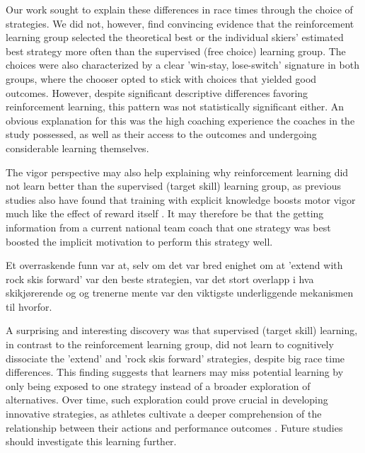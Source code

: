 Our work sought to explain these differences in race times through the choice of strategies. We did not, however,  find convincing evidence that the reinforcement learning group selected the theoretical best or the individual skiers' estimated best strategy more often than the supervised (free choice) learning group. The choices were also characterized by a clear 'win-stay, lose-switch' signature in both groups, where the chooser opted to stick with choices that yielded good outcomes. However, despite significant descriptive differences favoring reinforcement learning, this pattern was not statistically significant either. An obvious explanation for this was the high coaching experience the coaches in the study possessed, as well as their access to the outcomes and undergoing considerable learning themselves. 


The vigor perspective may also help explaining why reinforcement learning did not learn better than the supervised (target skill) learning group, as previous studies also have found that training with explicit knowledge boosts motor vigor much like the effect of reward itself \cite{anderson_rewards_2020, wong_explicit_2015}. It may therefore be that the getting information from a current national team coach that one strategy was best boosted the implicit motivation to perform this strategy well. 


Et overraskende funn var at, selv om det var bred enighet om at 'extend with rock skis forward' var den beste strategien, var det stort overlapp i hva skikjørerende og og trenerne mente var den viktigste underliggende mekanismen til hvorfor. 


A surprising and interesting discovery was that supervised (target skill) learning, in contrast to the reinforcement learning group, did not learn to cognitively dissociate the 'extend' and 'rock skis forward' strategies, despite big race time differences. This finding suggests that learners may miss potential learning by only being exposed to one strategy instead of a broader exploration of alternatives. Over time, such exploration could prove crucial in developing innovative strategies, as athletes cultivate a deeper comprehension of the relationship between their actions and performance outcomes \cite{ericsson_scientific_1998}. Future studies should investigate this learning further. 
